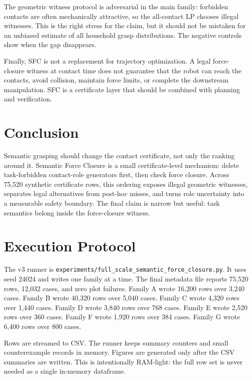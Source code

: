 \documentclass{article}
\begin{document}
The geometric witness protocol is adversarial in the main family: forbidden contacts are often mechanically attractive, so the all-contact LP chooses illegal witnesses. This is the right stress for the claim, but it should not be mistaken for an unbiased estimate of all household grasp distributions. The negative controls show when the gap disappears.

Finally, SFC is not a replacement for trajectory optimization. A legal force-closure witness at contact time does not guarantee that the robot can reach the contacts, avoid collision, maintain force limits, or complete the downstream manipulation. SFC is a certificate layer that should be combined with planning and verification.

\section{Conclusion}

Semantic grasping should change the contact certificate, not only the ranking around it. Semantic Force Closure is a small certificate-level mechanism: delete task-forbidden contact-role generators first, then check force closure. Across 75,520 synthetic certificate rows, this ordering exposes illegal geometric witnesses, separates legal alternatives from post-hoc misses, and turns role uncertainty into a measurable safety boundary. The final claim is narrow but useful: task semantics belong inside the force-closure witness.




\appendix
\renewcommand{\thesection}{\arabic{section}}

\section{Execution Protocol}

The v3 runner is \texttt{experiments/full\_scale\_semantic\_force\_closure.py}. It uses seed 24024 and writes one family at a time. The final metadata file reports 75,520 rows, 12,032 cases, and zero plot failures. Family A wrote 16,200 rows over 3,240 cases. Family B wrote 40,320 rows over 5,040 cases. Family C wrote 4,320 rows over 1,440 cases. Family D wrote 3,840 rows over 768 cases. Family E wrote 2,520 rows over 360 cases. Family F wrote 1,920 rows over 384 cases. Family G wrote 6,400 rows over 800 cases.

Rows are streamed to CSV. The runner keeps summary counters and small counterexample records in memory. Figures are generated only after the CSV summaries are written. This is intentionally RAM-light: the full row set is never needed as a single in-memory dataframe.
\end{document}
